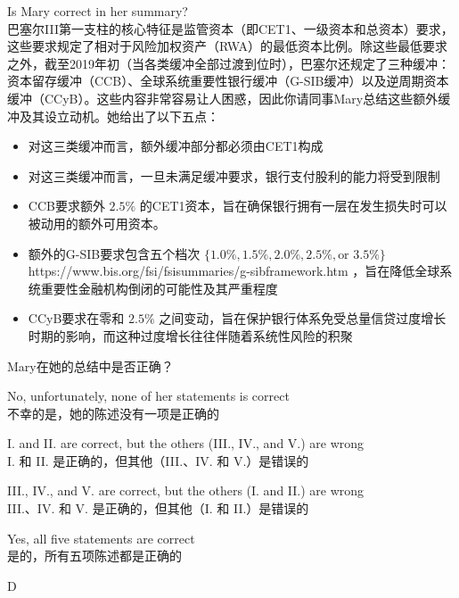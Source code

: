 \documentclass{article}
\newcounter{question} %
\begin{document}
\begin{question}
      Is Mary correct in her summary?\\
      巴塞尔III第一支柱的核心特征是监管资本（即CET1、一级资本和总资本）要求，这些要求规定了相对于风险加权资产（RWA）的最低资本比例。除这些最低要求之外，截至2019年初（当各类缓冲全部过渡到位时），巴塞尔还规定了三种缓冲：资本留存缓冲（CCB）、全球系统重要性银行缓冲（G-SIB缓冲）以及逆周期资本缓冲（CCyB）。这些内容非常容易让人困惑，因此你请同事Mary总结这些额外缓冲及其设立动机。她给出了以下五点：
      \begin{itemize}
      \item[I.] 对这三类缓冲而言，额外缓冲部分都必须由CET1构成
      \item[II.] 对这三类缓冲而言，一旦未满足缓冲要求，银行支付股利的能力将受到限制
      \item[III.] CCB要求额外 $2.5\%$ 的CET1资本，旨在确保银行拥有一层在发生损失时可以被动用的额外可用资本。
      \item[IV.] 额外的G-SIB要求包含五个档次 $\{1.0\%, 1.5\%, 2.0\%, 2.5\%, \text{or } 3.5\%\}$ https://www.bis.org/fsi/fsisummaries/g-sib\-framework.htm ，旨在降低全球系统重要性金融机构倒闭的可能性及其严重程度
     \item[V.] CCyB要求在零和 $2.5\%$ 之间变动，旨在保护银行体系免受总量信贷过度增长时期的影响，而这种过度增长往往伴随着系统性风险的积聚
     \end{itemize}
     Mary在她的总结中是否正确？
\end{question}
  
  \begin{choices}
      \item No, unfortunately, none of her statements is correct\\
      不幸的是，她的陈述没有一项是正确的
      \item I. and II. are correct, but the others (III., IV., and V.) are wrong\\
      I. 和 II. 是正确的，但其他（III.、IV. 和 V.）是错误的
      \item III., IV., and V. are correct, but the others (I. and II.) are wrong\\
      III.、IV. 和 V. 是正确的，但其他（I. 和 II.）是错误的
      \item Yes, all five statements are correct\\
      是的，所有五项陈述都是正确的
  \end{choices}
  
  \begin{correctanswer}
      D
  \end{correctanswer}
  
\end{document}
